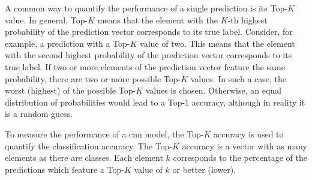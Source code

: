 A common way to quantify the performance of a single prediction is its Top-$K$ value.
In general, Top-$K$ means that the element with the $K$-th highest probability of the prediction vector corresponds to its true label.
Consider, for example, a prediction with a Top-$K$ value of two.
This means that the element with the second highest probability of the prediction vector corresponds to its true label.
If two or more elements of the prediction vector feature the same probability, there are two or more possible Top-$K$ values.
In such a case, the worst (highest) of the possible Top-$K$ values is chosen.
Otherwise, an equal distribution of probabilities would lead to a Top-1 accuracy, although in reality it is a random guess.

To measure the performance of a \acrshort{cnn} model, the Top-$K$ accuracy is used to quantify the classification accuracy.
The Top-$K$ accuracy is a vector with as many elements as there are classes.
Each element $k$ corresponds to the percentage of the predictions which feature a Top-$K$ value of $k$ or better (lower).

